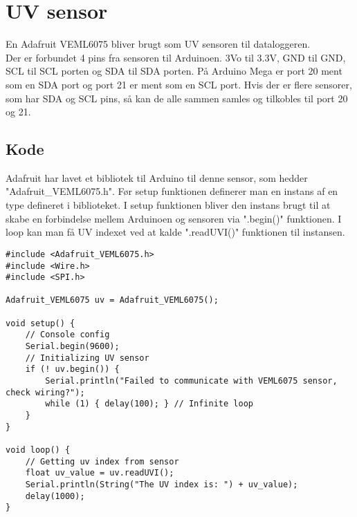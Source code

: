 \section{UV sensor}
	En Adafruit VEML6075 bliver brugt som UV sensoren til dataloggeren. \\ [7pt]
	Der er forbundet 4 pins fra sensoren til Arduinoen. 3Vo til 3.3V, GND til GND, SCL til SCL porten og SDA til SDA porten. På Arduino Mega er port 20 ment som en SDA port og port 21 er ment som en SCL port. Hvis der er flere sensorer, som har SDA og SCL pins, så kan de alle sammen samles og tilkobles til port 20 og 21.
	\subsection{Kode}
		Adafruit har lavet et bibliotek til Arduino til denne sensor, som hedder "Adafruit\_VEML6075.h". Før setup funktionen definerer man en instans af en type defineret i biblioteket. I setup funktionen bliver den instans brugt til at skabe en forbindelse mellem Arduinoen og sensoren via ".begin()"{} funktionen. I loop kan man få UV indexet ved at kalde ".readUVI()"{} funktionen til instansen. 
		\begin{lstlisting}
#include <Adafruit_VEML6075.h>
#include <Wire.h>
#include <SPI.h>

Adafruit_VEML6075 uv = Adafruit_VEML6075();

void setup() {
	// Console config
	Serial.begin(9600);
	// Initializing UV sensor
	if (! uv.begin()) {
		Serial.println("Failed to communicate with VEML6075 sensor, check wiring?");
		while (1) { delay(100); } // Infinite loop
	}
}

void loop() {
	// Getting uv index from sensor
	float uv_value = uv.readUVI();
	Serial.println(String("The UV index is: ") + uv_value);
	delay(1000);
}
		\end{lstlisting}